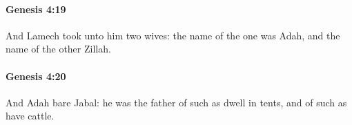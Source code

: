 		\paragraph{Genesis 4:19} %
			\label{GENESIS-4-19}

			And Lamech took unto him two wives: the name of the one was Adah, and the name of the other Zillah.


		\paragraph{Genesis 4:20} %
			\label{GENESIS-4-20}

			And Adah bare Jabal: he was the father of such as dwell in tents, and of such as have cattle.


